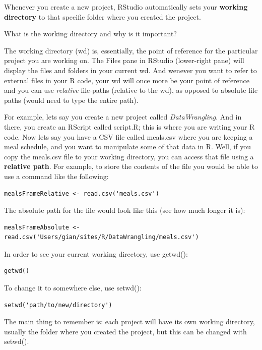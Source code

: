 \documentclass[]{book}
\begin{document}
Whenever you create a new project, RStudio automatically sets your \textbf{working directory} to that specific folder where you created the project.

What is the working directory and why is it important?

The working directory (wd) is, essentially, the point of reference for the particular project you are working on. The Files pane in RStudio (lower-right pane) will display the files and folders in your current wd. And wenever you want to refer to external files in your R code, your wd will once more be your point of reference and you can use \emph{relative} file-paths (relative to the wd), as opposed to absolute file paths (would need to type the entire path).

For example, lets say you create a new project called \emph{DataWrangling}. And in there, you create an RScript called script.R; this is where you are writing your R code. Now lets say you have a CSV file called meals.csv where you are keeping a meal schedule, and you want to manipulate some of that data in R. Well, if you copy the meals.csv file to your working directory, you can access that file using a \textbf{relative path}. For example, to store the contents of the file you would be able to use a command like the following:

\begin{verbatim}
mealsFrameRelative <- read.csv('meals.csv')
\end{verbatim}

The absolute path for the file would look like this (see how much longer it is):

\begin{verbatim}
mealsFrameAbsolute <- read.csv('Users/gian/sites/R/DataWrangling/meals.csv')
\end{verbatim}

In order to see your current working directory, use getwd():

\begin{verbatim}
getwd()
\end{verbatim}

To change it to somewhere else, use setwd():

\begin{verbatim}
setwd('path/to/new/directory')
\end{verbatim}

The main thing to remember is: each project will have its own working directory, usually the folder where you created the project, but this can be changed with setwd().
\end{document}
